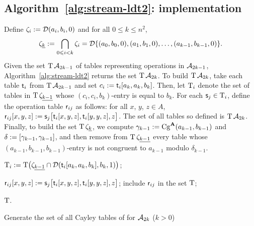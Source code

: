   \subsection{Algorithm~\ref{alg:stream-ldt2}: implementation}
  Define $\zeta_i := \mathcal{D} (a_i, b_i, 0)$ and for all $0\leq k \leq n^2$,
  \[
    \zeta_{\underline{k}} := \bigcap_{0\leqslant i < k}\zeta_i
      =\mathcal{D} \{(a_0, b_0, 0), (a_1, b_1, 0), \dots, (a_{k-1}, b_{k-1}, 0) \}.
  \]
  Given the set $\operatorname{T} \mathcal{A}_{2k-1}$ of tables representing operations in
  $\mathcal{A}_{2k-1}$, Algorithm~\ref{alg:stream-ldt2}
  returns the set $\operatorname{T} \mathcal{A}_{2k}$.
  To build $\operatorname{T} \mathcal{A}_{2k}$, take each table $\mathsf{t}_i$ from $\operatorname{T} \mathcal{A}_{2k-1}$
  and set $c_i:= \mathsf{t}_i[a_k, a_k, b_k]$. Then, let $\operatorname{T}_i$ denote
  the set of tables in $\operatorname{T} \zeta_{\underline{k-1}}$ whose
  $(c_i, c_i, b_k)$-entry is equal to $b_k$.
  For each $\mathsf{s}_j \in \operatorname{T}_i$, define the operation table
  $\mathsf{r}_{ij}$ as follows:
  for all $x$, $y$, $z \in A$,
  $\mathsf{r}_{ij}[x,y,z] :=  \mathsf{s}_{j}\bigl[\mathsf{t}_i[x,y,z], \mathsf{t}_i[y,y,z], z\bigr]$.
  The set of all tables so defined is $\operatorname{T} \mathcal{A}_{2k}$.
  Finally, to build the set $\operatorname{T} \zeta_{\underline{k}}$, we
  compute $\gamma_{k-1} := \operatorname{Cg}^{\mathbf{A}}(a_{k-1}, b_{k-1})$ and $\delta := [\gamma_{k-1}, \gamma_{k-1}]$,
  and then remove from $\operatorname{T} \zeta_{\underline{k-1}}$ every table whose
  $(a_{k-1},b_{k-1},b_{k-1})$-entry is not congruent to $a_{k-1}$ modulo $\delta_{k-1}$.



  \begin{algorithm}

     {

      $\operatorname{T}_i := \operatorname{T} \bigl( \zeta_{\underline{k-1}}  \cap \mathcal{D} (\mathsf{t}_i[a_k, a_k, b_k], b_k, 1)\bigr)$;

       {
          {
          $\mathsf{r}_{ij}[x,y,z] :=  \mathsf{s}_{j}\bigl[\mathsf{t}_i[x,y,z], \mathsf{t}_i[y,y,z], z\bigr]$;
        }
        include $\mathsf{r}_{ij}$ in the set $\operatorname{T}$;
      }
    }


    \Return $\operatorname{T}$.

    \caption{Generate the set of all Cayley tables of \ldtos for $\mathcal{A}_{2k}$ \label{alg:stream-ldt2} {\small ($k> 0$)}}
  \end{algorithm}


